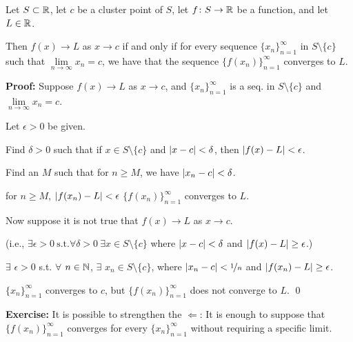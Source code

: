 \documentclass[10pt,aspectratio=169]{beamer}
\begin{document}
\begin{frame}
\begin{lemma}
Let $S \subset {\mathbb{R}}$, let $c$ be a cluster point of $S$, let $f \colon S \to
{\mathbb{R}}$ be a function, and let $L \in {\mathbb{R}}$.

\pause
Then
$f(x) \to L$ as $x \to c$ if and only if for every sequence
$\{ x_n \}_{n=1}^\infty$ in
$S \setminus \{c\}$
such that $\lim\limits_{n\to\infty} x_n = c$,
we have that the sequence $\{ f(x_n) \}_{n=1}^\infty$ converges to $L$.
\end{lemma}

\pause
\textbf{Proof:}
Suppose $f(x) \to L$ as $x \to c$, and $\{ x_n \}_{n=1}^\infty$ is a seq. in
$S \setminus \{c\}$ and $\lim\limits_{n\to\infty} x_n = c$.

\pause
Let $\epsilon > 0$ be given.

\pause
Find $\delta > 0$ such that
if $x \in S \setminus \{c\}$ and $\left\lvert {x-c} \right\rvert < \delta$, then
$\left\lvert {f(x) - L} \right\rvert < \epsilon$.

\pause
Find an $M$ such that for $n \geq M$, we have $\left\lvert {x_n - c} \right\rvert < \delta$.

\pause
\thus \quad for $n \geq M$, \quad
$\left\lvert {f(x_n) - L} \right\rvert < \epsilon$
\pause
\wthus $\{ f(x_n) \}_{n=1}^\infty$ converges to $L$.

\pause
\medskip

Now suppose
it is not true that $f(x) \to L$ as $x \to c$.

\pause
(i.e., $\exists \epsilon > 0 ~ \text{s.t.} \forall \delta > 0 ~ \exists x \in S
\setminus \{ c \}$ where $\left\lvert {x-c} \right\rvert < \delta$ and $\left\lvert {f(x)-L} \right\rvert \geq
\epsilon$.)

\pause
\thus \quad 
$\exists$ $\epsilon > 0$ s.t. $\forall$ $n \in {\mathbb{N}}$,
$\exists$ $x_n \in S \setminus \{c\}$, where
$\left\lvert {x_n-c} \right\rvert < \nicefrac{1}{n}$ and $\left\lvert {f(x_n)-L} \right\rvert \geq \epsilon$.

\pause
$\{ x_n \}_{n=1}^\infty$ converges to $c$, but
$\{ f(x_n) \}_{n=1}^\infty$ does not converge to $L$.
\qed

\pause
\medskip

\textbf{Exercise:} It is possible to strengthen the $\Leftarrow$:
It is enough to suppose that
$\{ f(x_n) \}_{n=1}^\infty$ converges for every $\{ x_n \}_{n=1}^\infty$ without requiring a specific limit.
\end{frame}
\end{document}
